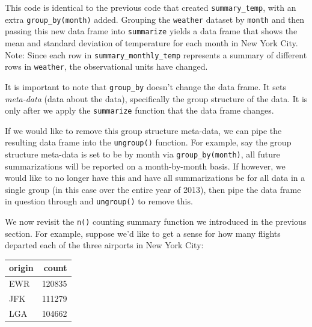 \documentclass[12pt,]{krantz}
\makeatletter
\newenvironment{Shaded}{\begin{snugshade}}{\end{snugshade}}
\newcommand{\KeywordTok}[1]{\textcolor[rgb]{0.27,0.27,0.27}{\textbf{#1}}}
\newcommand{\DataTypeTok}[1]{\textcolor[rgb]{0.27,0.27,0.27}{#1}}
\newcommand{\StringTok}[1]{\textcolor[rgb]{0.5,0.5,0.5}{#1}}
\newcommand{\OperatorTok}[1]{\textcolor[rgb]{0.43,0.43,0.43}{\textbf{#1}}}
\newcommand{\NormalTok}[1]{#1}
\newenvironment{kframe}{%
\medskip{}
\setlength{\fboxsep}{.8em}
 \def\at@end@of@kframe{}%
 \ifinner\ifhmode%
  \def\at@end@of@kframe{\end{minipage}}%
  \begin{minipage}{\columnwidth}%
 \fi\fi%
 \def\FrameCommand##1{\hskip\@totalleftmargin \hskip-\fboxsep
 \colorbox{shadecolor}{##1}\hskip-\fboxsep
     \hskip-\linewidth \hskip-\@totalleftmargin \hskip\columnwidth}%
 \MakeFramed {\advance\hsize-\width
   \@totalleftmargin\z@ \linewidth\hsize
   \@setminipage}}%
 {\par\unskip\endMakeFramed%
 \at@end@of@kframe}
\renewenvironment{Shaded}{\begin{kframe}}{\end{kframe}}
\theoremstyle{definition}
\theoremstyle{definition}
\theoremstyle{definition}
\theoremstyle{remark}
\makeatother
\begin{document}
This code is identical to the previous code that created
\texttt{summary\_temp}, with an extra \texttt{group\_by(month)} added.
Grouping the \texttt{weather} dataset by \texttt{month} and then passing
this new data frame into \texttt{summarize} yields a data frame that
shows the mean and standard deviation of temperature for each month in
New York City. Note: Since each row in \texttt{summary\_monthly\_temp}
represents a summary of different rows in \texttt{weather}, the
observational units have changed.

It is important to note that \texttt{group\_by} doesn't change the data
frame. It sets \emph{meta-data} (data about the data), specifically the
group structure of the data. It is only after we apply the
\texttt{summarize} function that the data frame changes.

If we would like to remove this group structure meta-data, we can pipe
the resulting data frame into the \texttt{ungroup()} function. For
example, say the group structure meta-data is set to be by month via
\texttt{group\_by(month)}, all future summarizations will be reported on
a month-by-month basis. If however, we would like to no longer have this
and have all summarizations be for all data in a single group (in this
case over the entire year of 2013), then pipe the data frame in question
through and \texttt{ungroup()} to remove this.

We now revisit the \texttt{n()} counting summary function we introduced
in the previous section. For example, suppose we'd like to get a sense
for how many flights departed each of the three airports in New York
City:

\begin{Shaded}
\end{Shaded}

\begin{table}[H]
\centering\begingroup\fontsize{10}{12}\selectfont

\begin{tabular}{l|r}
\hline
origin & count\\
\hline
EWR & 120835\\
\hline
JFK & 111279\\
\hline
LGA & 104662\\
\hline
\end{tabular}
\endgroup{}
\end{table}
\end{document}
